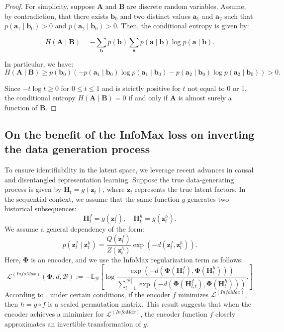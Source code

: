 \documentclass{article}
\theoremstyle{plain}
\theoremstyle{definition}
\theoremstyle{remark}
\begin{document}
\begin{proof}
For simplicity, suppose \( \mathbf{A} \) and \( \mathbf{B} \) are discrete random variables. Assume, by contradiction, that there exists \( \mathbf{b}_0 \) and two distinct values \( \mathbf{a}_1 \) and \( \mathbf{a}_2 \) such that \( p(\mathbf{a}_1 \mid \mathbf{b}_0) > 0 \) and \( p(\mathbf{a}_2 \mid \mathbf{b}_0) > 0 \). Then, the conditional entropy is given by:

\begin{equation*}
    H(\mathbf{A} \mid \mathbf{B}) = - \sum_{\mathbf{b}} p(\mathbf{b}) \sum_{\mathbf{a}} p(\mathbf{a} \mid \mathbf{b}) \log p(\mathbf{a} \mid \mathbf{b}).
\end{equation*}

In particular, we have:
\[
H(\mathbf{A} \mid \mathbf{B}) \geq p(\mathbf{b}_0) \left(-p(\mathbf{a}_1 \mid \mathbf{b}_0) \log p(\mathbf{a}_1 \mid \mathbf{b}_0) - p(\mathbf{a}_2 \mid \mathbf{b}_0) \log p(\mathbf{a}_2 \mid \mathbf{b}_0) \right) > 0.
\]

Since \( -t \log t \geq 0 \) for \( 0 \leq t \leq 1 \) and is strictly positive for \( t \) not equal to 0 or 1, the conditional entropy \( H(\mathbf{A} \mid \mathbf{B}) = 0 \) if and only if \( \mathbf{A} \) is almost surely a function of \( \mathbf{B} \).
\end{proof}


\subsection{On the benefit of the InfoMax loss on inverting the data generation process}
\label{appendix: infomax_inverting_dgp}
To ensure identifiability in the latent space, we leverage recent advances in causal and disentangled representation learning. Suppose the true data-generating process is given by $\mathbf{H}_{t} = g(\mathbf{z}_t)$, where $\mathbf{z}_t$ represents the true latent factors. In the sequential context, we assume that the same function $g$ generates two historical subsequences:
\[
\mathbf{H}_t^f = g(\mathbf{z}_t^f), \quad \mathbf{H}_t^h = g(\mathbf{z}_t^h).
\]
We assume a general dependency of the form:
\[
p(\mathbf{z}_t^f \mid \mathbf{z}_t^h ) = \frac{Q(\mathbf{z}_t^f)}{Z(\mathbf{z}_t^h)} \exp(-d(\mathbf{z}_t^f, \mathbf{z}_t^h)).
\]
Here, $\mathbf{\Phi}$ is an encoder, and we use the InfoMax regularization term as follows:
\[
\mathcal{L}^{(InfoMax)}(\mathbf{\Phi}, d, \mathcal{B}) := -\mathbb{E}_{\mathcal{B}} \left[ \log \frac{\exp(-d(\mathbf{\Phi}(\mathbf{H}_t^f), \mathbf{\Phi}(\mathbf{H}_t^h)))}{\sum_{l = 1}^{|\mathcal{B}|} \exp(-d(\mathbf{\Phi}(\mathbf{H}_{l,t}^f), \mathbf{\Phi}(\mathbf{H}_t^h)))}. \right]
\]
According to \cite{matthes2023towards}, under certain conditions, if the encoder $f$ minimizes $\mathcal{L}^{(InfoMax)}$, then $h = g \circ f$ is a scaled permutation matrix. This result suggests that when the encoder achieves a minimizer for $\mathcal{L}^{(InfoMax)}$, the encoder function $f$ closely approximates an invertible transformation of $g$.
\end{document}
